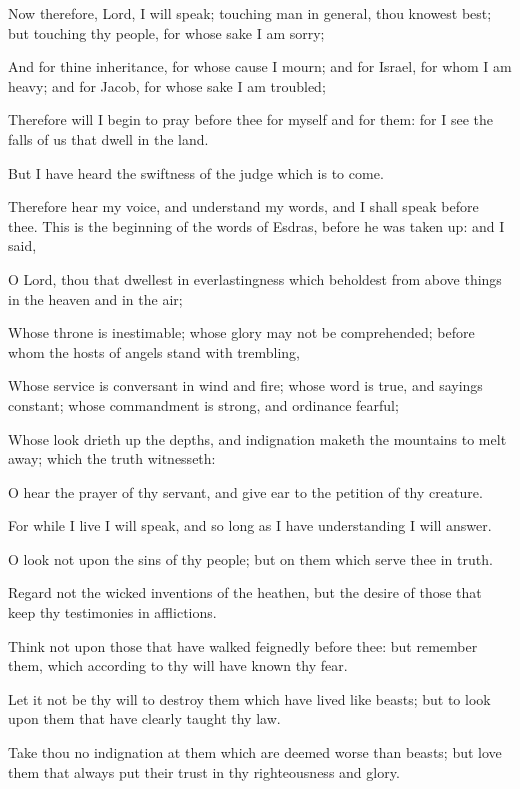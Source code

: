 {\par }{\PP {}Now therefore, Lord, I will speak; touching man in general, thou knowest best; but touching thy people, for whose sake I am sorry;
\par }{\PP {}And for thine inheritance, for whose cause I mourn; and for Israel, for whom I am heavy; and for Jacob, for whose sake I am troubled;
\par }{\PP {}Therefore will I begin to pray before thee for myself and for them: for I see the falls of us that dwell in the land.
\par }{\PP {}But I have heard the swiftness of the judge which is to come.
\par }{\PP {}Therefore hear my voice, and understand my words, and I shall speak before thee. This is the beginning of the words of Esdras, before he was taken up: and I said,
\par }{\PP {}O Lord, thou that dwellest in everlastingness which beholdest from above things in the heaven and in the air;
\par }{\PP {}Whose throne is inestimable; whose glory may not be comprehended; before whom the hosts of angels stand with trembling,
\par }{\PP {}Whose service is conversant in wind and fire; whose word is true, and sayings constant; whose commandment is strong, and ordinance fearful;
\par }{\PP {}Whose look drieth up the depths, and indignation maketh the mountains to melt away; which the truth witnesseth:
\par }{\PP {}O hear the prayer of thy servant, and give ear to the petition of thy creature.
\par }{\PP {}For while I live I will speak, and so long as I have understanding I will answer.
\par }{\PP {}O look not upon the sins of thy people; but on them which serve thee in truth.
\par }{\PP {}Regard not the wicked inventions of the heathen, but the desire of those that keep thy testimonies in afflictions.
\par }{\PP {}Think not upon those that have walked feignedly before thee: but remember them, which according to thy will have known thy fear.
\par }{\PP {}Let it not be thy will to destroy them which have lived like beasts; but to look upon them that have clearly taught thy law.
\par }{\PP {}Take thou no indignation at them which are deemed worse than beasts; but love them that always put their trust in thy righteousness and glory.
}

